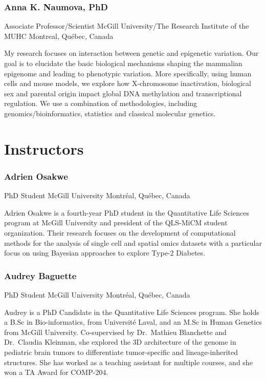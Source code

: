 \documentclass[
]{book}
\begin{document}
\subsubsection{Anna K. Naumova, PhD}\label{anna-k.-naumova-phd}

Associate Professor/Scientist
McGill University/The Research Institute of the MUHC
Montreal, Québec, Canada

My research focuses on interaction between genetic and epigenetic variation. Our goal is to elucidate the basic biological mechanisms shaping the mammalian epigenome and leading to phenotypic variation. More specifically, using human cells and mouse models, we explore how X-chromosome inactivation, biological sex and parental origin impact global DNA methylation and transcriptional regulation. We use a combination of methodologies, including genomics/bioinformatics, statistics and classical molecular genetics.

\section{Instructors}\label{instructors}

\subsubsection{Adrien Osakwe}\label{adrien-osakwe}

PhD Student
McGill University
Montréal, Québec, Canada

Adrien Osakwe is a fourth-year PhD student in the Quantitative Life Sciences program at McGill University and president of the QLS-MiCM student organization. Their research focuses on the development of computational methods for the analysis of single cell and spatial omics datasets with a particular focus on using Bayesian approaches to explore Type-2 Diabetes.

\subsubsection{Audrey Baguette}\label{audrey-baguette}

PhD Student
McGill University
Montréal, Québec, Canada

Audrey is a PhD Candidate in the Quantitative Life Sciences program. She holds a B.Sc in Bio-informatics, from Université Laval, and an M.Sc in Human Genetics from McGill University. Co-supervised by Dr.~Mathieu Blanchette and Dr.~Claudia Kleinman, she explored the 3D architecture of the genome in pediatric brain tumors to differentiate tumor-specific and lineage-inherited structures. She has worked as a teaching assistant for multiple courses, and she won a TA Award for COMP-204.
\end{document}
